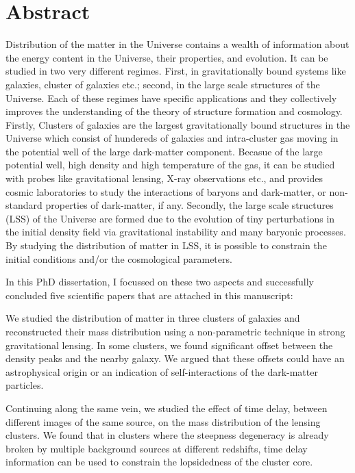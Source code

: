 {}


\chapter*{Abstract}

Distribution of the matter in the Universe contains a wealth of information about 
the energy content in the Universe, their properties, and evolution. It can 
be studied in two very different regimes. First, in gravitationally 
bound systems like galaxies, cluster of galaxies etc.; second, in the 
large scale structures of the Universe. Each of these regimes have specific
applications and they collectively improves the understanding of the theory of 
structure formation and cosmology.  Firstly, Clusters of galaxies are
the largest gravitationally bound structures in the Universe which consist
of hundereds of galaxies and intra-cluster gas moving in the potential well 
of the large dark-matter component. Becasue of the large potential well, high 
density and high temperature of the gas, it can be studied with probes like 
gravitational lensing, X-ray observations etc., and provides cosmic 
laboratories to study the interactions of baryons and dark-matter, or
non-standard properties of dark-matter, if any.
Secondly, the large scale structures (LSS) of the Universe are 
formed due to the evolution 
of tiny perturbations in the initial density field via gravitational 
instability and many baryonic processes. By studying the 
distribution of matter in LSS, it is possible to constrain the initial
conditions and/or the cosmological parameters. 

In this PhD dissertation, I focussed on these two aspects and successfully 
concluded five scientific papers that are attached in this manuscript:

We studied the distribution of matter in three clusters of galaxies
and reconstructed their mass distribution using a non-parametric technique in 
strong gravitational lensing. In some clusters, we found significant offset
between the density peaks and the nearby galaxy. We argued that these offsets
could have an astrophysical origin or an indication of self-interactions
of the dark-matter particles.

Continuing along the same vein, we studied
the effect of time delay, between different images of the same source,
on the mass distribution of the lensing clusters. We found that in clusters
where the steepness degeneracy is already broken by multiple background sources
at different redshifts, time delay information can be used to constrain
the lopsidedness of the cluster core.


